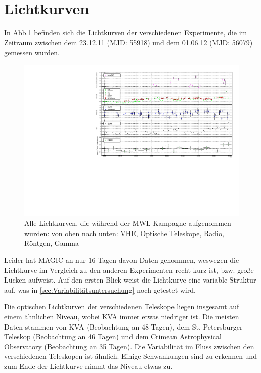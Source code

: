\section{Lichtkurven}
In Abb.\ref{LC_MWL} befinden sich die Lichtkurven der verschiedenen Experimente, die im Zeitraum zwischen dem 23.12.11 (MJD: 55918) und dem 01.06.12 (MJD: 56079) gemessen wurden.

\begin{figure}
    \centering
    \includegraphics[width=1\textwidth]{./Plots/05_MWL/LC_final.pdf}
    \caption{Alle Lichtkurven, die während der MWL-Kampagne aufgenommen wurden: von oben nach unten: VHE, Optische Teleskope, Radio, Röntgen, Gamma}
    \label{LC_MWL}
\end{figure}

Leider hat MAGIC an nur 16 Tagen davon Daten genommen, weswegen die Lichtkurve im Vergleich zu den anderen Experimenten recht kurz ist, bzw. große Lücken aufweist.
Auf den ersten Blick weist die Lichtkurve eine variable Struktur auf, was in \autoref{sec:Variabilitätsuntersuchung} noch getestet wird.

Die optischen Lichtkurven der verschiedenen Teleskope liegen insgesamt auf einem ähnlichen Niveau, wobei KVA immer etwas niedriger ist.
Die meisten Daten stammen von KVA (Beobachtung an 48 Tagen), dem St. Petersburger Teleskop (Beobachtung an 46 Tagen) und dem Crimean Astrophysical Observatory (Beobachtung an 35 Tagen).
Die Variabilität im Fluss zwischen den verschiedenen Teleskopen ist ähnlich. 
Einige Schwankungen sind zu erkennen und zum Ende der Lichtkurve nimmt das Niveau etwas zu.

